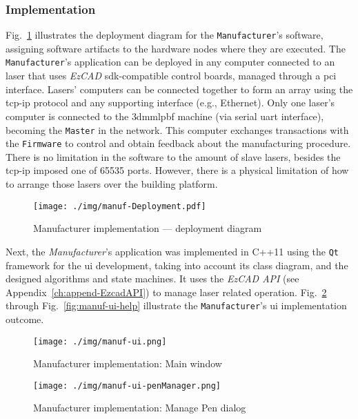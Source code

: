 \subsubsection{Implementation}%
\label{sec:manuf-implem}
Fig.~\ref{fig:manuf-deployment} illustrates the deployment diagram for the
\texttt{Manufacturer}'s software, assigning software artifacts to the hardware
nodes where they are executed. The \texttt{Manufacturer}'s application can be
deployed in any computer connected to an laser that uses \emph{EzCAD}
\gls{sdk}-compatible control boards, managed through a \gls{pci}
interface. Lasers' computers can be connected together to form an array using the
\gls{tcp-ip} protocol and any supporting interface (e.g., Ethernet).
Only one
laser's computer is connected to the \gls{3dmmlpbf} machine (via serial
\gls{uart} interface), becoming the \texttt{Master} in the network. This
computer exchanges transactions with the \texttt{Firmware} to control and obtain
feedback about the manufacturing procedure. There is no limitation in the
software to the amount of slave lasers, besides the \gls{tcp-ip} imposed one of
65535 ports. However, there is a physical limitation of how to arrange those
lasers over the building platform.

\begin{figure}[!hbt]
  \centering
  \texttt{[image: ./img/manuf-Deployment.pdf]} 
  \caption{Manufacturer implementation --- deployment diagram}%
  \label{fig:manuf-deployment}
\end{figure}%

Next, the \emph{Manufacturer}'s application was implemented in C++11 using the 
\texttt{Qt} framework for the \gls{ui} development, taking into
account its class diagram, and the designed algorithms and state machines. It
uses the \emph{EzCAD API} (see Appendix~\ref{ch:append-EzcadAPI}) to manage laser
related operation. Fig.~\ref{fig:manuf-ui} through Fig.~\ref{fig:manuf-ui-help}
illustrate the \texttt{Manufacturer}'s \gls{ui} implementation outcome.

\begin{figure}[!hbt]
  \centering
  \texttt{[image: ./img/manuf-ui.png]} 
  \caption{Manufacturer implementation: Main window}%
  \label{fig:manuf-ui}
\end{figure}%

\begin{figure}[!hbt]
  \centering
  \texttt{[image: ./img/manuf-ui-penManager.png]} 
  \caption{Manufacturer implementation: Manage Pen dialog}%
  \label{fig:manuf-ui-penManager}
\end{figure}%

